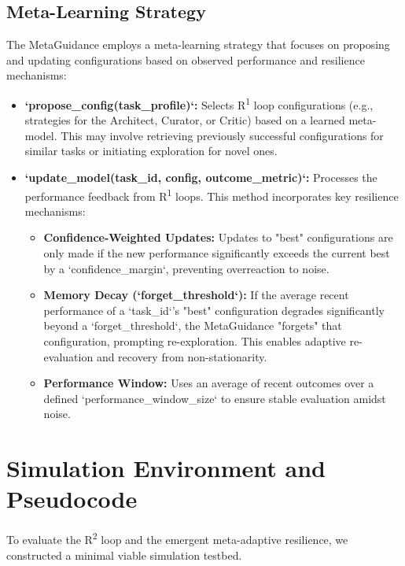 \documentclass{article}
\begin{document}
\subsection{Meta-Learning Strategy}
The MetaGuidance employs a meta-learning strategy that focuses on proposing and updating configurations based on observed performance and resilience mechanisms:
\begin{itemize}
    \item \textbf{`propose_config(task_profile)`:} Selects R\textsuperscript{1} loop configurations (e.g., strategies for the Architect, Curator, or Critic) based on a learned meta-model. This may involve retrieving previously successful configurations for similar tasks or initiating exploration for novel ones.
    \item \textbf{`update_model(task_id, config, outcome_metric)`:} Processes the performance feedback from R\textsuperscript{1} loops. This method incorporates key resilience mechanisms:
    \begin{itemize}
        \item \textbf{Confidence-Weighted Updates:} Updates to "best" configurations are only made if the new performance significantly exceeds the current best by a `confidence_margin`, preventing overreaction to noise.
        \item \textbf{Memory Decay (`forget_threshold`):} If the average recent performance of a `task_id`'s "best" configuration degrades significantly beyond a `forget_threshold`, the MetaGuidance "forgets" that configuration, prompting re-exploration. This enables adaptive re-evaluation and recovery from non-stationarity.
        \item \textbf{Performance Window:} Uses an average of recent outcomes over a defined `performance_window_size` to ensure stable evaluation amidst noise.
    \end{itemize}
\end{itemize}

\section{Simulation Environment and Pseudocode}
To evaluate the R\textsuperscript{2} loop and the emergent meta-adaptive resilience, we constructed a minimal viable simulation testbed.
\end{document}
